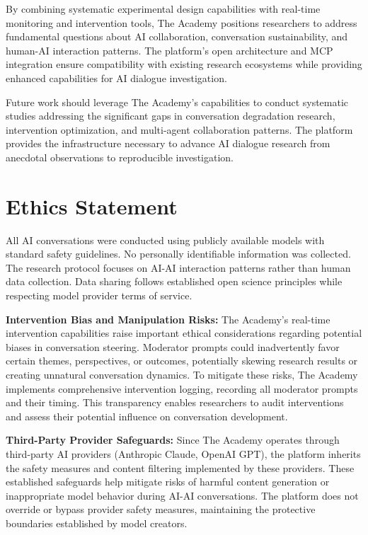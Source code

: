 \documentclass[11pt,letterpaper]{article}
\newcommand{\theacademy}{The Academy}
\newcommand{\mcp}{MCP}
\begin{document}
By combining systematic experimental design capabilities with real-time monitoring and intervention tools, \theacademy{} positions researchers to address fundamental questions about AI collaboration, conversation sustainability, and human-AI interaction patterns. The platform's open architecture and \mcp{} integration ensure compatibility with existing research ecosystems while providing enhanced capabilities for AI dialogue investigation.

Future work should leverage \theacademy{}'s capabilities to conduct systematic studies addressing the significant gaps in conversation degradation research, intervention optimization, and multi-agent collaboration patterns. The platform provides the infrastructure necessary to advance AI dialogue research from anecdotal observations to reproducible investigation.

\section*{Ethics Statement}

All AI conversations were conducted using publicly available models with standard safety guidelines. No personally identifiable information was collected. The research protocol focuses on AI-AI interaction patterns rather than human data collection. Data sharing follows established open science principles while respecting model provider terms of service.

\textbf{Intervention Bias and Manipulation Risks:} The Academy's real-time intervention capabilities raise important ethical considerations regarding potential biases in conversation steering. Moderator prompts could inadvertently favor certain themes, perspectives, or outcomes, potentially skewing research results or creating unnatural conversation dynamics. To mitigate these risks, The Academy implements comprehensive intervention logging, recording all moderator prompts and their timing. This transparency enables researchers to audit interventions and assess their potential influence on conversation development.

\textbf{Third-Party Provider Safeguards:} Since The Academy operates through third-party AI providers (Anthropic Claude, OpenAI GPT), the platform inherits the safety measures and content filtering implemented by these providers. These established safeguards help mitigate risks of harmful content generation or inappropriate model behavior during AI-AI conversations. The platform does not override or bypass provider safety measures, maintaining the protective boundaries established by model creators.
\end{document}
